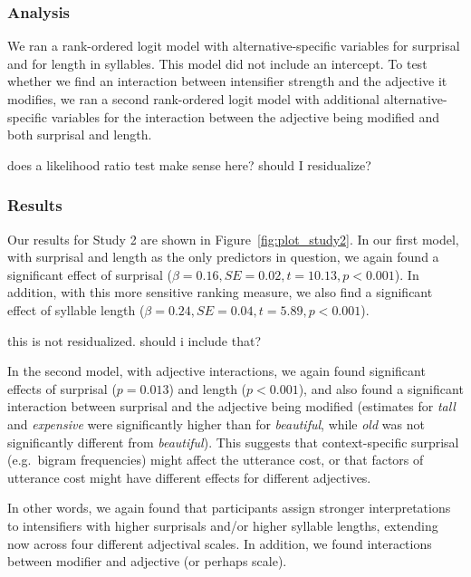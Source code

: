 \documentclass[10pt,letterpaper]{article}
\newcommand{\w}[1]{\emph{#1}}
\newcommand{\todo}[1]{{\color{red}#1}}
\begin{document}
\subsubsection{Analysis}

We ran a rank-ordered logit model \cite{beggs_assessing_1981, hausman_specifying_1987} with alternative-specific variables for surprisal and for length in syllables. This model did not include an intercept.
%
To test whether we find an interaction between intensifier strength and the adjective it modifies, we ran a second rank-ordered logit model with additional alternative-specific variables for the interaction between the adjective being modified and both surprisal and length. 

\todo{does a likelihood ratio test make sense here? should I residualize?}

\subsubsection{Results}

Our results for Study 2 are shown in Figure~\ref{fig:plot_study2}. In our first model, with surprisal and length as the only predictors in question, we again found a significant effect of surprisal ($\beta=0.16, SE=0.02, t=10.13, p<0.001$). In addition, with this more sensitive ranking measure, we also find a significant effect of syllable length ($\beta=0.24, SE=0.04, t=5.89, p<0.001$).

\todo{this is not residualized. should i include that?}

In the second model, with adjective interactions, we again found significant effects of surprisal ($p=0.013$) and length ($p<0.001$), and also found a significant interaction between surprisal and the adjective being modified (estimates for \w{tall} and \w{expensive} were significantly higher than for \w{beautiful}, while \w{old} was not significantly different from \w{beautiful}).
This suggests that context-specific surprisal (e.g.~bigram frequencies) might affect the utterance cost, or that factors of utterance cost might have different effects for different adjectives.

In other words, we again found that participants assign stronger interpretations to intensifiers with higher surprisals and/or higher syllable lengths, extending now across four different adjectival scales. In addition, we found interactions between modifier and adjective (or perhaps scale).
\end{document}

